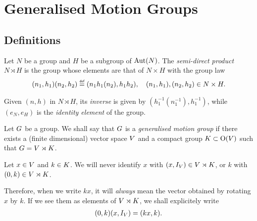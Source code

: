 \chapter{Generalised Motion Groups}

\section{Definitions}

\begin{definition}
\label{definition:semi-direct_products}
    Let $N$ be a group and $H$ be a subgroup of $\operatorname{Aut}(N)$.
    The \emph{semi-direct product} $N \rtimes H$ is the group whose elements are that of $N \times H$ with the group law
    \begin{align}
        (n_1, h_1) (n_2, h_2) \defeq (n_1 h_1(n_2), h_1 h_2), \quad (n_1, h_1), (n_2, h_2) \in N \times H.
    \end{align}

    Given $(n, h)$ in $N \rtimes H$, its \emph{inverse} is given by $(h_1^{-1}(n_1^{-1}), h_1^{-1})$,
    while $(e_N, e_H)$ is the \emph{identity element} of the group.
\end{definition}

\begin{definition}
\label{definition:generalised_motion_group}
    Let $G$ be a group.
    We shall say that $G$ is a \emph{generalised motion group}
    if there exists a (finite dimensional) vector space $V$ and a compact group $K \subset {\mathrm{O} (V)}$ such that $G = V \rtimes K$.
\end{definition}

\begin{remark}
    Let $x \in V$ and $k \in K$.
    We will never identify $x$ with $(x, {I_{V}}) \in V \rtimes K$,
    or $k$ with $(0, k) \in V \rtimes K$.

    Therefore, when we write $k x$, it will \emph{always} mean the vector obtained by rotating $x$ by $k$.
    If we see them as elements of $V \rtimes K$,
    we shall explicitely write
    \begin{align*}
        (0, k) (x, {I_{V}}) = (k x, k).
    \end{align*}
\end{remark}

